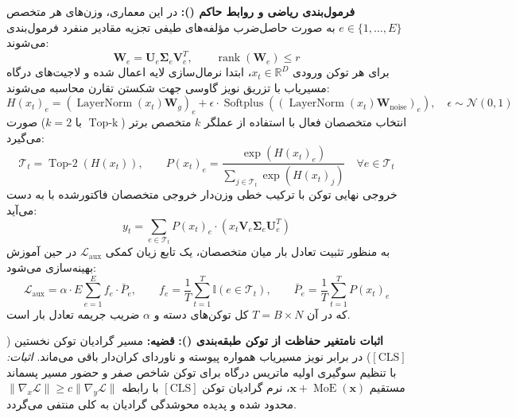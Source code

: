 \textbf{فرمول‌بندی ریاضی و روابط حاکم ():}
در این معماری، وزن‌های هر متخصص $e \in \{1, \dots, E\}$ به صورت حاصل‌ضرب مؤلفه‌های طیفی تجزیه مقادیر منفرد فرمول‌بندی می‌شوند:
\begin{equation}
\mathbf{W}_e = \mathbf{U}_e \mathbf{\Sigma}_e \mathbf{V}_e^T, \qquad \operatorname{rank}(\mathbf{W}_e) \le r
\end{equation}
برای هر توکن ورودی $x_t \in \mathbb{R}^D$، ابتدا نرمال‌سازی لایه اعمال شده و لاجیت‌های درگاه مسیریاب با تزریق نویز گاوسی جهت شکستن تقارن محاسبه می‌شوند:
\begin{equation}
H(x_t)_e = (\operatorname{LayerNorm}(x_t) \mathbf{W}_g)_e + \epsilon \cdot \operatorname{Softplus}((\operatorname{LayerNorm}(x_t) \mathbf{W}_{\text{noise}})_e), \quad \epsilon \sim \mathcal{N}(0, 1)
\end{equation}
انتخاب متخصصان فعال با استفاده از عملگر $k$ متخصص برتر ($\operatorname{Top-k}$ با $k=2$) صورت می‌گیرد:
\begin{equation}
\mathcal{T}_t = \operatorname{Top-2}(H(x_t)), \qquad P(x_t)_e = \frac{\exp(H(x_t)_e)}{\sum_{j \in \mathcal{T}_t} \exp(H(x_t)_j)} \quad \forall e \in \mathcal{T}_t
\end{equation}
خروجی نهایی توکن با ترکیب خطی وزن‌دار خروجی متخصصان فاکتورشده با  به دست می‌آید:
\begin{equation}
y_t = \sum_{e \in \mathcal{T}_t} P(x_t)_e \cdot \left( x_t \mathbf{V}_e \mathbf{\Sigma}_e \mathbf{U}_e^T \right)
\end{equation}
به منظور تثبیت تعادل بار میان متخصصان، یک تابع زیان کمکی $\mathcal{L}_{\text{aux}}$ در حین آموزش بهینه‌سازی می‌شود:
\begin{equation}
\mathcal{L}_{\text{aux}} = \alpha \cdot E \sum_{e=1}^E f_e \cdot \bar{P}_e, \qquad
f_e = \frac{1}{T} \sum_{t=1}^T \mathbb{I}(e \in \mathcal{T}_t), \qquad
\bar{P}_e = \frac{1}{T} \sum_{t=1}^T P(x_t)_e
\end{equation}
که در آن $T = B \times N$ کل توکن‌های دسته و $\alpha$ ضریب جریمه تعادل بار است.

\textbf{اثبات نامتغیر حفاظت از توکن طبقه‌بندی ():}
\textbf{قضیه:} مسیر گرادیان توکن نخستین ($[\text{CLS}]$) در برابر نویز مسیریاب همواره پیوسته و ناوردای کران‌دار باقی می‌ماند.
\textit{اثبات:} با تنظیم سوگیری اولیه ماتریس درگاه برای توکن شاخص صفر و حضور مسیر پسماند مستقیم $\mathbf{x} + \operatorname{MoE}(\mathbf{x})$، نرم گرادیان توکن $[\text{CLS}]$ با رابطه $\|\nabla_x \mathcal{L}\| \ge c \|\nabla_y \mathcal{L}\|$ محدود شده و پدیده محوشدگی گرادیان به کلی منتفی می‌گردد.



